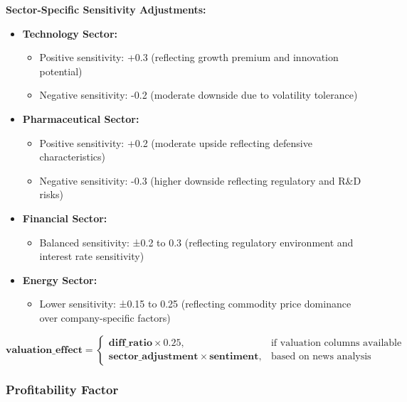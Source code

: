 \documentclass[3p,times,procedia]{elsarticle}
\begin{document}
\textbf{Sector-Specific Sensitivity Adjustments:}
\begin{itemize}
    \item \textbf{Technology Sector:} 
    \begin{itemize}
        \item Positive sensitivity: +0.3 (reflecting growth premium and innovation potential)
        \item Negative sensitivity: -0.2 (moderate downside due to volatility tolerance)
    \end{itemize}
    
    \item \textbf{Pharmaceutical Sector:}
    \begin{itemize}
        \item Positive sensitivity: +0.2 (moderate upside reflecting defensive characteristics)
        \item Negative sensitivity: -0.3 (higher downside reflecting regulatory and R\&D risks)
    \end{itemize}
    
    \item \textbf{Financial Sector:}
    \begin{itemize}
        \item Balanced sensitivity: ±0.2 to 0.3 (reflecting regulatory environment and interest rate sensitivity)
    \end{itemize}
    
    \item \textbf{Energy Sector:}
    \begin{itemize}
        \item Lower sensitivity: ±0.15 to 0.25 (reflecting commodity price dominance over company-specific factors)
    \end{itemize}
\end{itemize}

\begin{equation}
\textbf{valuation\_effect} = 
\begin{cases} 
\textbf{diff\_ratio} \times 0.25, & \text{if valuation columns available} \\
\textbf{sector\_adjustment} \times \textbf{sentiment}, & \text{based on news analysis}
\end{cases}
\end{equation}

\subsubsection{{Profitability Factor}}
\end{document}
